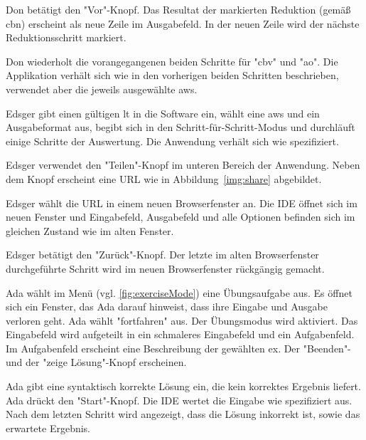 \documentclass[parskip=full,11pt,twoside]{scrartcl}
\begin{document}
{Don betätigt den "Vor"-Knopf.}
{Das Resultat der markierten Reduktion (gemäß \gls{cbn}) erscheint als neue Zeile im Ausgabefeld.
In der neuen Zeile wird der nächste Reduktionsschritt markiert.}

{Don wiederholt die vorangegangenen beiden Schritte für "\gls{cbv}" und "\gls{ao}".}
{Die Applikation verhält sich wie in den vorherigen beiden Schritten beschrieben,
verwendet aber die jeweils ausgewählte \gls{aws}.}


{Edsger gibt einen gültigen \gls{lt} in die Software ein, wählt eine \gls{aws} und ein
Ausgabeformat aus, begibt sich in den Schritt-für-Schritt-Modus und durchläuft einige
Schritte der Auswertung.}
{Die Anwendung verhält sich wie spezifiziert.}

{Edsger verwendet den "Teilen"-Knopf im unteren Bereich der Anwendung.}
{Neben dem Knopf erscheint eine URL wie in Abbildung~\ref{img:share}
abgebildet.}

{Edsger wählt die URL in einem neuen Browserfenster an.}
{Die IDE öffnet sich im neuen Fenster und Eingabefeld, Ausgabefeld und alle Optionen befinden sich im gleichen Zustand wie im alten Fenster.}

{Edsger betätigt den "Zurück"-Knopf.}
{Der letzte im alten Browserfenster durchgeführte Schritt wird im neuen Browserfenster
rückgängig gemacht.}


{Ada wählt im Menü (vgl. \cref{fig:exerciseMode}) eine Übungsaufgabe aus.}
{Es öffnet sich ein Fenster, das Ada darauf hinweist, dass ihre Eingabe und Ausgabe verloren geht.
 Ada wählt "fortfahren" aus.
 Der Übungsmodus wird aktiviert. 
 Das Eingabefeld wird aufgeteilt in ein schmaleres Eingabefeld und ein Aufgabenfeld.
 Im Aufgabenfeld erscheint eine Beschreibung der gewählten \gls{ex}.
 Der "Beenden"- und der "zeige Lösung"-Knopf erscheinen.}

{Ada gibt eine syntaktisch korrekte Lösung ein, die kein korrektes Ergebnis liefert.
 Ada drückt den "Start"-Knopf.}
{Die IDE wertet die Eingabe wie spezifiziert aus.
 Nach dem letzten Schritt wird angezeigt, dass die Lösung inkorrekt ist, sowie das erwartete Ergebnis.}
\end{document}
